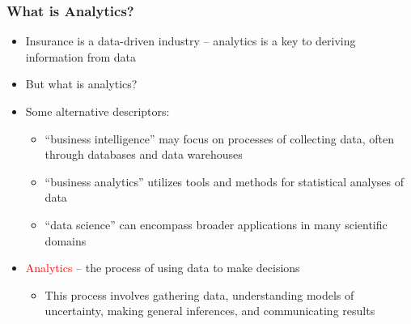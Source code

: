 \documentclass[serif,10pt]{beamer}
\begin{document}
\begin{frame}
\frametitle{What is Analytics?}

 \begin{itemize}
 \item Insurance is a data-driven industry -- analytics is a key to deriving information from
 data \vspace{2mm}

  \item But what is analytics? \vspace{2mm}

  \pause

  \item Some alternative descriptors: \vspace{2mm}
   \begin{itemize}
 \item ``business intelligence'' may focus on processes of collecting data, often through databases and data
 warehouses \vspace{2mm}
 \item ``business analytics'' utilizes tools and methods for statistical analyses of
 data \vspace{2mm}
  \item ``data science'' can encompass broader applications in many scientific
  domains \vspace{2mm}
  \end{itemize}
  \pause
  \item \textcolor{red}{Analytics} -- the process of using data to make
  decisions \vspace{2mm}
     \begin{itemize}
  \item This process involves gathering data, understanding models of uncertainty, making general inferences, and communicating
  results \vspace{2mm}
    \end{itemize}
\end{itemize}\end{frame}
\end{document}
